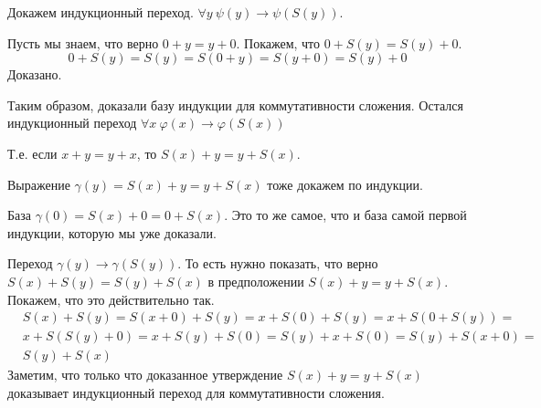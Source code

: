 \begin{enumerate}
Докажем индукционный переход. $\forall y \ \psi(y) \to \psi(S(y))$.

Пусть мы знаем, что верно $0 + y = y + 0$. Покажем, что $0 + S(y) = S(y) + 0$.
\begin{equation*}
	0 + S(y) = S(y) = S(0 + y) = S(y + 0) = S(y) + 0
\end{equation*}
Доказано.

Таким образом, доказали базу индукции для коммутативности сложения. Остался индукционный переход $\forall x \ \varphi(x) \to \varphi(S(x))$

Т.е. если $x + y = y + x$, то $S(x) + y = y + S(x)$.

Выражение $\gamma(y) = S(x) + y = y + S(x)$ тоже докажем по индукции.

База $\gamma(0) = S(x) + 0 = 0 + S(x)$. Это то же самое, что и база самой первой индукции, которую мы уже доказали.

Переход $\gamma(y) \to \gamma(S(y))$. То есть нужно показать, что верно $S(x) + S(y) = S(y) + S(x)$ в предположении $S(x) + y = y + S(x)$. Покажем, что это действительно так.
\begin{align*}
	&S(x) + S(y) = S(x + 0) + S(y) = x + S(0) + S(y) = x + S(0 + S(y)) =\\ &x + S(S(y) + 0) = x + S(y) + S(0) = S(y) + x + S(0) = S(y) + S(x + 0) =\\ &S(y) + S(x)
\end{align*}
Заметим, что только что доказанное утверждение $S(x) + y = y + S(x)$ доказывает индукционный переход для коммутативности сложения. 

\end{enumerate}

